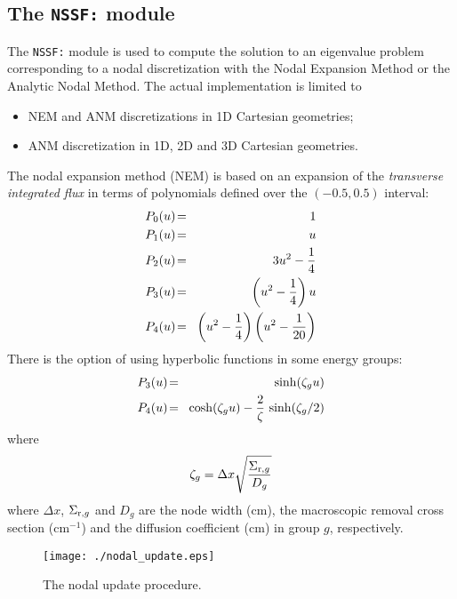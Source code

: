 \clearpage

\subsection{The {\tt NSSF:} module}

The {\tt NSSF:} module is used to compute the solution to an eigenvalue problem corresponding to a nodal discretization with the Nodal
Expansion Method or the Analytic Nodal Method. The actual implementation is limited to
\begin{itemize}
\item NEM and ANM discretizations in 1D Cartesian geometries;
\item ANM discretization in 1D, 2D and 3D Cartesian geometries.
\end{itemize}

\vskip 0.08cm

The nodal expansion method (NEM) is based on an expansion of the {\sl transverse integrated flux} in terms of polynomials defined
over the $(-0.5,0.5)$ interval\cite{nestle}:
\begin{eqnarray}
\nonumber P_0(u)\negthinspace &=&\negthinspace 1\\
\nonumber P_1(u)\negthinspace &=&\negthinspace u\\
\nonumber P_2(u)\negthinspace &=&\negthinspace 3u^2-{1\over 4}\\
\nonumber P_3(u)\negthinspace &=&\negthinspace \left( u^2-{1\over 4}\right)u\\
P_4(u)\negthinspace &=&\negthinspace \left( u^2-{1\over 4}\right)\left( u^2-{1\over 20}\right)
\label{eq:nem1}
\end{eqnarray}
There is the option of using hyperbolic functions in some energy groups:
\begin{eqnarray}
\nonumber P_3(u)\negthinspace &=&\negthinspace \sinh(\zeta_g u)\\
P_4(u)\negthinspace &=&\negthinspace \cosh(\zeta_g u)-{2\over \zeta}\, \sinh(\zeta_g/2)
\label{eq:nem2}
\end{eqnarray}
\noindent where
\begin{equation}
\zeta_g=\Delta x\sqrt{\Sigma_{{\rm r},g} \over D_g}
\end{equation}
\noindent where $\Delta x$, $\Sigma_{{\rm r},g}$ and $D_g$ are the node width (cm), the macroscopic removal cross section (cm$^{-1}$)
and the diffusion coefficient (cm) in group $g$, respectively.

\vskip 0.1cm
%
\vspace{2pt}
\begin{figure}[!h]
\centering
\texttt{[image: ./nodal\_update.eps]}
\parbox{11cm}{\caption{The nodal update procedure.}\label{fig:nodal_update}}   
\vspace{2pt}
\end{figure}
%

